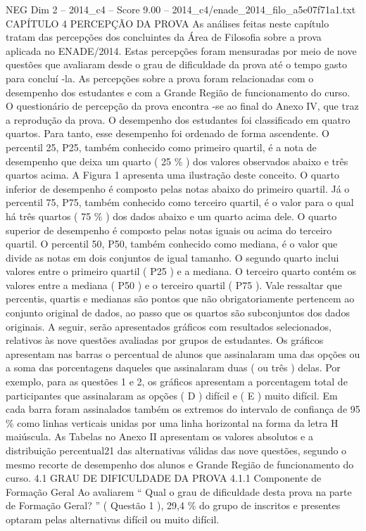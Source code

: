\begin{textsample}{NEG Dim 2 – 2014\_c4 – Score 9.00 – 2014\_c4/enade\_2014\_filo\_a5e07f71a1.txt}  \label{ex:f2_neg_319}
CAPÍTULO 4 PERCEPÇÃO DA PROVA As análises feitas neste capítulo tratam das percepções dos concluintes da Área de Filosofia sobre a prova aplicada no ENADE/2014.
Estas percepções foram mensuradas por meio de nove questões que avaliaram desde o grau de dificuldade da prova até o tempo gasto para concluí -la.
As percepções sobre a prova foram relacionadas com o desempenho dos estudantes e com a Grande Região de funcionamento do curso.
O questionário de percepção da prova encontra -se ao final do Anexo IV, que traz a reprodução da prova.
O desempenho dos estudantes foi classificado em quatro quartos.
Para tanto, esse desempenho foi ordenado de forma ascendente.
O percentil 25, P25, também conhecido como primeiro quartil, é a nota de desempenho que deixa um quarto ( 25 \% ) dos valores observados abaixo e três quartos acima.
A Figura 1 apresenta uma ilustração deste conceito.
O quarto inferior de desempenho é composto pelas notas abaixo do primeiro quartil.
Já o percentil 75, P75, também conhecido como terceiro quartil, é o valor para o qual há três quartos ( 75 \% ) dos dados abaixo e um quarto acima dele.
O quarto superior de desempenho é composto pelas notas iguais ou acima do terceiro quartil.
O percentil 50, P50, também conhecido como mediana, é o valor que divide as notas em dois conjuntos de igual tamanho.
O segundo quarto inclui valores entre o primeiro quartil ( P25 ) e a mediana.
O terceiro quarto contém os valores entre a mediana ( P50 ) e o terceiro quartil ( P75 ).
Vale ressaltar que percentis, quartis e medianas são pontos que não obrigatoriamente pertencem ao conjunto original de dados, ao passo que os quartos são subconjuntos dos dados originais.
A seguir, serão apresentados gráficos com resultados selecionados, relativos às nove questões avaliadas por grupos de estudantes.
Os gráficos apresentam nas barras o percentual de alunos que assinalaram uma das opções ou a soma das porcentagens daqueles que assinalaram duas ( ou três ) delas.
Por exemplo, para as questões 1 e 2, os gráficos apresentam a porcentagem total de participantes que assinalaram as opções ( D ) difícil e ( E ) muito difícil.
Em cada barra foram assinalados também os extremos do intervalo de confiança de 95 \% como linhas verticais unidas por uma linha horizontal na forma da letra H maiúscula.
As Tabelas no Anexo II apresentam os valores absolutos e a distribuição percentual21 das alternativas válidas das nove questões, segundo o mesmo recorte de desempenho dos alunos e Grande Região de funcionamento do curso. 4.1 GRAU DE DIFICULDADE DA PROVA 4.1.1 Componente de Formação Geral Ao avaliarem “ Qual o grau de dificuldade desta prova na parte de Formação Geral? ” ( Questão 1 ), 29,4 \% do grupo de inscritos e presentes optaram pelas alternativas difícil ou muito difícil.

\end{textsample}
